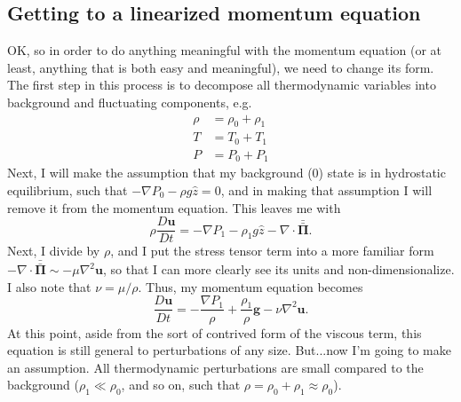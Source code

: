 \documentclass[aps, pre, onecolumn, nofootinbib, notitlepage, groupedaddress, amsfonts, amssymb, amsmath, longbibliography]{revtex4-1}
\newcommand{\grad}{\ensuremath{\nabla}}
\newcommand{\stressT}{\ensuremath{\bm{\bar{\bar{\Pi}}}}}
\begin{document}
\subsection{Getting to a linearized momentum equation}
OK, so in order to do anything meaningful with the momentum equation (or at least, anything
that is both easy and meaningful), we need to change its form.  The first step in this process
is to decompose all thermodynamic variables into background and fluctuating components, e.g.
\begin{equation}
\begin{split}
\rho &= \rho_0 + \rho_1 \\
T &= T_0 + T_1 \\
P &= P_0 + P_1
\end{split}
\end{equation}
Next, I will make the assumption that my background (0) state is in hydrostatic equilibrium,
such that $-\grad P_0 - \rho g \hat{z} = 0$, and in making that assumption I will remove it
from the momentum equation.  This leaves me with
\begin{equation}
\rho \frac{D\bm{u}}{Dt} = -\grad P_1 - \rho_1 g \hat{z} - \grad\cdot\stressT.
\end{equation}
Next, I divide by $\rho$, and I put the stress tensor term into a more familiar form
$-\grad\cdot\stressT \sim -\mu \grad^2 \bm{u}$, so that I can more clearly see its
units and non-dimensionalize.  I also note that $\nu = \mu / \rho$.  Thus, my momentum
equation becomes
\begin{equation}
\frac{D \bm{u}}{Dt} = -\frac{\grad P_1}{\rho} + \frac{\rho_1}{\rho}\bm{g} - \nu \grad^2 \bm{u}.
\end{equation}
At this point, aside from the sort of contrived form of the viscous term, this equation is
still general to perturbations of any size.  But...now I'm going to make an assumption. All
thermodynamic perturbations are small compared to the background ($\rho_1 \ll \rho_0$,
and so on, such that $\rho = \rho_0 + \rho_1 \approx \rho_0$).
\end{document}
